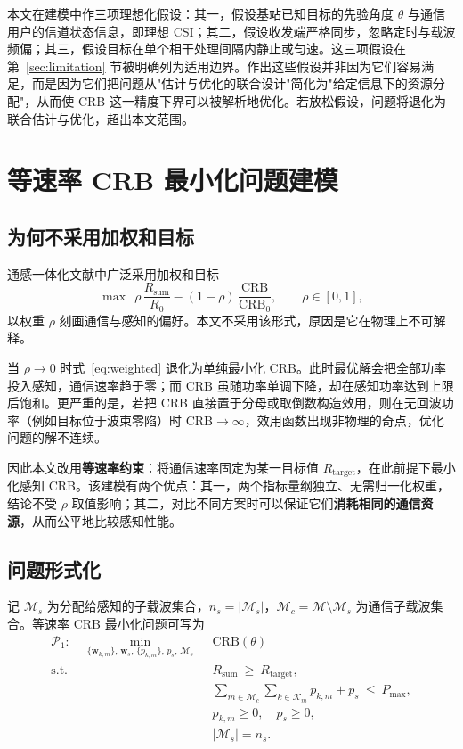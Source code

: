 本文在建模中作三项理想化假设：其一，假设基站已知目标的先验角度 $\theta$ 与通信用户的信道状态信息，即理想 CSI；其二，假设收发端严格同步，忽略定时与载波频偏；其三，假设目标在单个相干处理间隔内静止或匀速。这三项假设在第~\ref{sec:limitation} 节被明确列为适用边界。作出这些假设并非因为它们容易满足，而是因为它们把问题从"估计与优化的联合设计"简化为"给定信息下的资源分配"，从而使 CRB 这一精度下界可以被解析地优化。若放松假设，问题将退化为联合估计与优化，超出本文范围。

\section{等速率 CRB 最小化问题建模}
\label{sec:problem}

\subsection{为何不采用加权和目标}
\label{sec:why_not_weighted}

通感一体化文献中广泛采用加权和目标
\begin{equation}
  \max\ \ \rho\,\frac{R_{\mathrm{sum}}}{R_{0}}-(1-\rho)\,\frac{\mathrm{CRB}}{\mathrm{CRB}_{0}},\qquad \rho\in[0,1],
  \label{eq:weighted}
\end{equation}
以权重 $\rho$ 刻画通信与感知的偏好。本文不采用该形式，原因是它在物理上不可解释。

当 $\rho\to0$ 时式~\eqref{eq:weighted} 退化为单纯最小化 CRB。此时最优解会把全部功率投入感知，通信速率趋于零；而 $\mathrm{CRB}$ 虽随功率单调下降，却在感知功率达到上限后饱和。更严重的是，若把 CRB 直接置于分母或取倒数构造效用，则在无回波功率（例如目标位于波束零陷）时 $\mathrm{CRB}\to\infty$，效用函数出现非物理的奇点，优化问题的解不连续。

因此本文改用\textbf{等速率约束}：将通信速率固定为某一目标值 $R_{\mathrm{target}}$，在此前提下最小化感知 CRB。该建模有两个优点：其一，两个指标量纲独立、无需归一化权重，结论不受 $\rho$ 取值影响；其二，对比不同方案时可以保证它们\textbf{消耗相同的通信资源}，从而公平地比较感知性能。

\subsection{问题形式化}
\label{sec:p1}

记 $\mathcal{M}_{s}$ 为分配给感知的子载波集合，$n_{s}=\lvert\mathcal{M}_{s}\rvert$，$\mathcal{M}_{c}=\mathcal{M}\setminus\mathcal{M}_{s}$ 为通信子载波集合。等速率 CRB 最小化问题可写为
\begin{equation}
  \begin{aligned}
    \mathcal{P}_{1}:\quad \min_{\{\mathbf{w}_{k,m}\},\,\mathbf{w}_{s},\,\{p_{k,m}\},\,p_{s},\,\mathcal{M}_{s}}\ \ &
    \mathrm{CRB}(\theta)\\
    \text{s.t.}\quad & R_{\mathrm{sum}}\ \ge\ R_{\mathrm{target}},\\
    & \sum_{m\in\mathcal{M}_{c}}\sum_{k\in\mathcal{K}_m}p_{k,m}+p_{s}\ \le\ P_{\max},\\
    & p_{k,m}\ge0,\quad p_{s}\ge0,\\
    & \lvert\mathcal{M}_{s}\rvert=n_{s}.
  \end{aligned}
  \label{eq:p1}
\end{equation}

